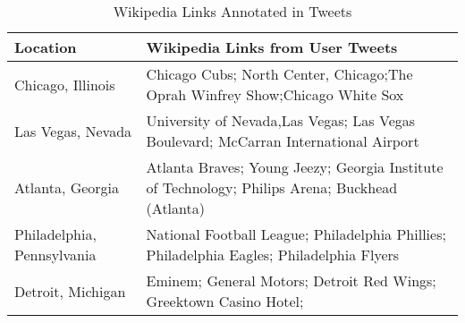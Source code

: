 \begin{table}
\begin{tabular}{|p{3cm}|p{8cm}|}
\hline
\textbf{Location}&{\textbf{Wikipedia Links from User Tweets}}\\
\hline
{Chicago, Illinois}&{Chicago Cubs; North Center, Chicago;The Oprah Winfrey Show;Chicago White Sox}\\
\hline
{Las Vegas, Nevada}&{University of Nevada,Las Vegas; Las Vegas Boulevard; McCarran International Airport}\\
\hline
{Atlanta, Georgia}&{Atlanta Braves; Young Jeezy; Georgia Institute of Technology; Philips Arena; Buckhead (Atlanta)}\\
\hline
{Philadelphia, Pennsylvania}&{National Football League; Philadelphia Phillies; Philadelphia Eagles; Philadelphia Flyers}\\
\hline
{Detroit, Michigan}&{Eminem; General Motors; Detroit Red Wings; Greektown Casino Hotel;}\\
\hline
\end{tabular}
\caption{Wikipedia Links Annotated in Tweets}
\label{table:wikilinks}
\end{table}


